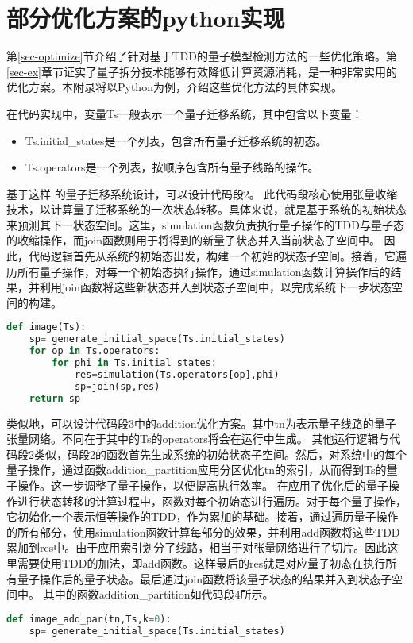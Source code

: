 \thispagestyle{appendixheader}
\setcounter{app_fig}{1}
\setcounter{app_tab}{1}
\setcounter{equation}{0}
\renewcommand\theequation{附\arabic{app}-\arabic{equation}}
\renewcommand\chaptername{附录}
\renewcommand\chaptername{Appendix} 
\renewcommand\thechapter{附录\zhnum{app}} 

\setcounter{chapter}{0}
\setcounter{section}{0}
\chapter{部分优化方案的python实现}\label{chap:app1}{
第\ref{sec-optimize}节介绍了针对基于TDD的量子模型检测方法的一些优化策略。第\ref{sec-ex}章节证实了量子拆分技术能够有效降低计算资源消耗，是一种非常实用的优化方案。本附录将以Python为例，介绍这些优化方法的具体实现。

在代码实现中，变量Ts一般表示一个量子迁移系统，其中包含以下变量：
\begin{itemize}
    \item Ts.initial\_states是一个列表，包含所有量子迁移系统的初态。
    \item Ts.operators是一个列表，按顺序包含所有量子线路的操作。
\end{itemize}
基于这样 的量子迁移系统设计，可以设计代码段2。
此代码段核心使用张量收缩技术，以计算量子迁移系统的一次状态转移。具体来说，就是基于系统的初始状态来预测其下一状态空间。这里，simulation函数负责执行量子操作的TDD与量子态的收缩操作，而join函数则用于将得到的新量子状态并入当前状态子空间中。
因此，代码逻辑首先从系统的初始态出发，构建一个初始的状态子空间。接着，它遍历所有量子操作，对每一个初始态执行操作，通过simulation函数计算操作后的结果，并利用join函数将这些新状态并入到状态子空间中，以完成系统下一步状态空间的构建。
\begin{lstlisting}[language=Python, caption={利用TDD收缩直接计算一步迁移\label{code-image}}]
def image(Ts):
    sp= generate_initial_space(Ts.initial_states)
    for op in Ts.operators:
        for phi in Ts.initial_states:
            res=simulation(Ts.operators[op],phi)
            sp=join(sp,res)
    return sp
\end{lstlisting}

类似地，可以设计代码段3中的addition优化方案。其中tn为表示量子线路的量子张量网络。不同在于其中的Ts的operators将会在运行中生成。
其他运行逻辑与代码段2类似，码段2的函数首先生成系统的初始状态子空间。然后，对系统中的每个量子操作，通过函数addition\_partition应用分区优化tn的索引，从而得到Ts的量子操作。这一步调整了量子操作，以便提高执行效率。
在应用了优化后的量子操作进行状态转移的计算过程中，函数对每个初始态进行遍历。对于每个量子操作，它初始化一个表示恒等操作的TDD，作为累加的基础。接着，通过遍历量子操作的所有部分，使用simulation函数计算每部分的效果，并利用add函数将这些TDD累加到res中。由于应用索引划分了线路，相当于对张量网络进行了切片。因此这里需要使用TDD的加法，即add函数。这样最后的res就是对应量子初态在执行所有量子操作后的量子状态。最后通过join函数将该量子状态的结果并入到状态子空间中。
其中的函数addition\_partition如代码段4所示。
\begin{lstlisting}[language=Python, caption=对量子线路应用addition优化方案计算一步迁移]
def image_add_par(tn,Ts,k=0):
    sp= generate_initial_space(Ts.initial_states)


\end{lstlisting}}
